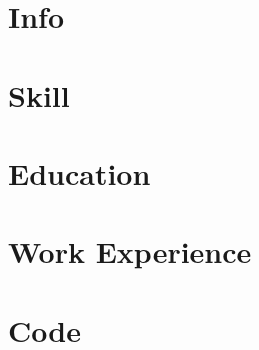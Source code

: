 \documentclass{article}
\begin{document}
	\section*{Info}
		
	\section*{Skill}
		
	\section*{Education}
		
	\section*{Work Experience}
		
	\section*{Code}
			
			
			
\end{document}
